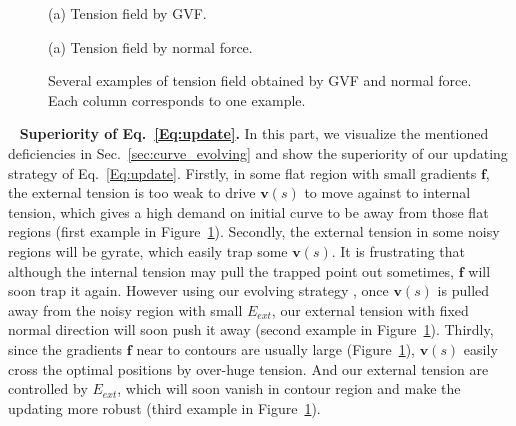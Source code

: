 \begin{figure}[t]
\begin{minipage}[b]{1.0\linewidth}
  \centering
 \centerline{}
  \centerline{(a) Tension field by GVF.}\medskip
\end{minipage}
\begin{minipage}[b]{1.0\linewidth}
 \centerline{}
  \centerline{(a) Tension field by normal force.}\medskip
\end{minipage}
%
\caption{Several examples of tension field obtained by GVF and normal force. Each column corresponds to one example.}
\label{fig:gvf}
\end{figure}
~ \noindent\textbf{Superiority of Eq.~\ref{Eq:update}.}
In this part, we visualize the mentioned deficiencies in Sec.~\ref{sec:curve_evolving} and show the superiority of our updating strategy of Eq.~\ref{Eq:update}.
Firstly, in some flat region with small gradients $\mathbf{f}$, the external tension is too weak to drive $\mathbf{v}(s)$ to move against to internal tension, which gives a high demand on initial curve to be away from those flat regions (first example in Figure~\ref{fig:gvf}).
Secondly, the external tension in some noisy regions will be gyrate, which easily trap some $\mathbf{v}(s)$.
It is frustrating that although the internal tension may pull the trapped point out sometimes, $\mathbf{f}$ will soon trap it again.
However using our evolving strategy , once $\mathbf{v}(s)$ is pulled away from the noisy region with small $E_{ext}$, our external tension with fixed normal direction will soon push it away (second example in Figure~\ref{fig:gvf}).
Thirdly, since the gradients $\mathbf{f}$ near to contours are usually large (Figure~\ref{fig:gvf}), $\mathbf{v}(s)$ easily cross the optimal positions by over-huge tension.
And our external tension are controlled by $E_{ext}$, which will soon vanish in contour region and make the updating more robust (third example in Figure~\ref{fig:gvf}).

